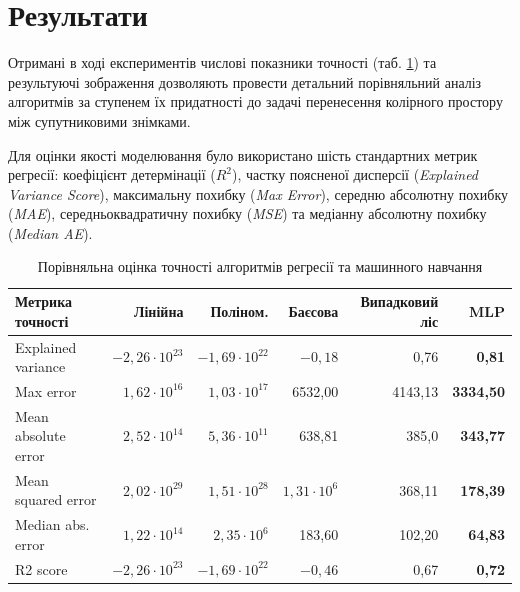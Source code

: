 \section{Результати}

Отримані в ході експериментів числові показники точності (таб. \ref{tab:models-comparison})
та результуючі зображення дозволяють провести детальний порівняльний аналіз
алгоритмів за ступенем їх придатності до задачі перенесення колірного простору
між супутниковими знімками.

Для оцінки якості моделювання було використано шість стандартних метрик регресії:
коефіцієнт детермінації ($R^{2}$), частку поясненої дисперсії (\textit{Explained
Variance Score}), максимальну похибку (\textit{Max Error}), середню абсолютну
похибку (\textit{MAE}), середньоквадратичну похибку (\textit{MSE}) та медіанну абсолютну
похибку (\textit{Median AE}).

\begin{table}[H]
	\centering
	\caption{Порівняльна оцінка точності алгоритмів регресії та машинного навчання}
	\label{tab:models-comparison}
	\vspace{2mm}
	\small
	\begin{tabular}{|l|r|r|r|r|r|}
		\hline
		\textbf{Метрика точності} & \textbf{Лінійна}      & \textbf{Поліном.}     & \textbf{Баєсова}    & \textbf{Випадковий ліс} & \textbf{MLP}     \\
		\hline
		Explained variance        & $-2,26 \cdot 10^{23}$ & $-1,69 \cdot 10^{22}$ & $-0,18$             & 0,76                    & \textbf{0,81}    \\
		\hline
		Max error                 & $1,62 \cdot 10^{16}$  & $1,03 \cdot 10^{17}$  & 6532,00             & 4143,13                 & \textbf{3334,50} \\
		\hline
		Mean absolute error       & $2,52 \cdot 10^{14}$  & $5,36 \cdot 10^{11}$  & 638,81              & 385,0                   & \textbf{343,77}  \\
		\hline
		Mean squared error        & $2,02 \cdot 10^{29}$  & $1,51 \cdot 10^{28}$  & $1,31 \cdot 10^{6}$ & 368,11                  & \textbf{178,39}  \\
		\hline
		Median abs. error         & $1,22 \cdot 10^{14}$  & $2,35 \cdot 10^{6}$   & 183,60              & 102,20                  & \textbf{64,83}   \\
		\hline
		R2 score                  & $-2,26 \cdot 10^{23}$ & $-1,69 \cdot 10^{22}$ & $-0,46$             & 0,67                    & \textbf{0,72}    \\
		\hline
	\end{tabular}
\end{table}

